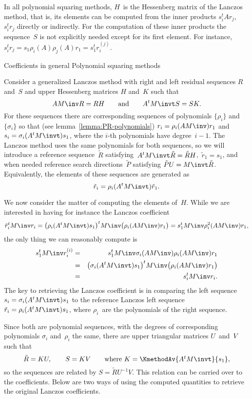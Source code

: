 In all polynomial squaring methods, $H$~is the Hessenberg matrix of
the Lanczos method, that is, its elements  can be computed from the inner
products $s_i^tAr_j$,~$s_i^tr_j$ directly or indirectly.
For the computation of these inner products
the sequence~$S$ is not explicitly needed except for its
first element. For instance,
$s_i^tr_j=s_1\rho_i(A)\rho_j(A)r_1=s_1^tr_i^{(j)}$.

 {Coefficients in general Polynomial squaring methods}

Consider a generalized
Lanczos method with right and left residual sequences $R$ and~$S$ and upper
Hessenberg matrices $H$ and~$K$ such that
\[ AM\inv R=RH \qquad\hbox{and}\qquad A^tM\invt S=SK. \]
For these sequences there are corresponding
sequences of polynomials $\{\rho_i\}$ and~$\{\sigma_i\}$ so that
(see lemma~\ref{lemma:PR-polynomials})
$r_i=\rho_i(AM\inv)r_1$ and~$s_i=\sigma_i(A^tM\invt)s_1$,
where the $i$-th polynomials
have degree~$i-1$.
The Lanczos method uses the same polynomials for both sequences, so we
will introduce a reference sequence~$\tilde R$
satisfying~$A^tM\invt\tilde R=\tilde RH$,~$\tilde r_1=s_1$,
and when needed reference search directions~$\tilde P$
satisfying $\tilde PU=\nobreak M\invt\tilde R$.
Equivalently, the elements of these
sequences are generated as \[ \tilde r_i=\rho_i(A^tM\invt)\tilde r_1. \]

We now consider the matter of computing the elements of~$H$.
While we are interested in having 
for instance the Lanczos coefficient
\begin{equation}
  \tilde r_i^tM\inv r_i
  =\bigl(\rho_i(A^tM\invt)s_1\bigr)^tM\inv \bigl(\rho_i(AM\inv)r_1\bigr) =
  s_1^tM\inv\rho_i^2(AM\inv)r_1,
	\label{eq:rho-lanczos}\end{equation}
the only thing we can reasonably compute is
\begin{eqnarray*}
  s_1^tM\inv r_i^{(i)}&=&s_1^tM\inv\sigma_i(AM\inv)\rho_i(AM\inv)r_1\\
  &=&\bigl(\sigma_i(A^tM\invt)s_1\bigr)^tM\inv\bigl(\rho_i(AM\inv)r_1\bigr)\\
  &=&s_i^tM\inv r_i.
	\label{eq:rho-bicgs}\end{eqnarray*}
The key to retrieving the Lanczos coefficient is 
in comparing the left sequence $s_i=\sigma_i(A^tM\invt)s_1$ to the reference
Lanczos left sequence $\tilde r_i=\rho_i(A^tM\invt)s_1$,
where $\rho_i$~are the polynomials of the right sequence.

Since both are polynomial sequences,
with the degrees of
corresponding polynomials $\sigma_i$ and~$\rho_i$ the same,
there are upper triangular
matrices $U$~and~$V$ such that
\[ \tilde R=KU,\qquad S=KV\qquad \hbox{where $K=\KmethodAv{A^tM\invt}{s_1}$},
   \]
so the sequences are related by $S=\tilde RU^{-1}V$. This
relation can be carried over to the coefficients.
Below are two ways of using the computed
quantities to retrieve the original Lanczos coefficients.

